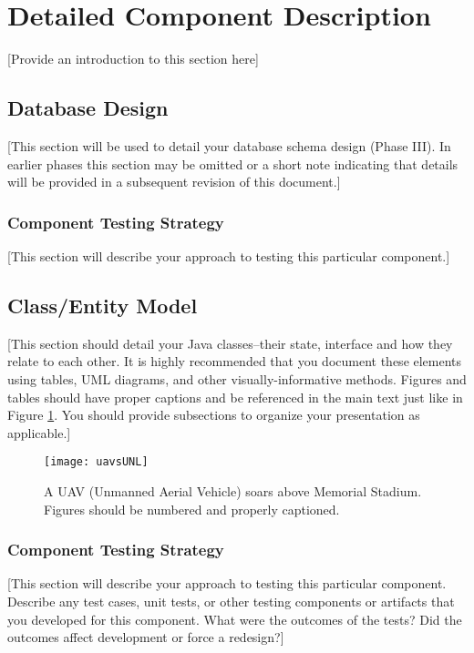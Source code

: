 \documentclass[12pt]{scrartcl} %
\begin{document}
\section{Detailed Component Description}

[Provide an introduction to this section here]

\subsection{Database Design}

[This section will be used to detail your database schema design (Phase III).  In earlier phases this section may be omitted or a short note indicating that details will be provided in a subsequent revision of this document.]

\subsubsection{Component Testing Strategy}

[This section will describe your approach to testing this particular component.]

\subsection{Class/Entity Model}

[This section should detail your Java classes--their state, interface and how they relate to each other.  It is highly recommended that you document these elements using tables, UML diagrams, and other visually-informative methods.  Figures and tables should have proper captions and be referenced in the main text just like in Figure \ref{figure:uav}.  You should provide subsections to organize your presentation as applicable.]

\begin{figure}
\centering
\texttt{[image: uavsUNL]}
\caption{A UAV (Unmanned Aerial Vehicle) soars above Memorial Stadium.  Figures should be numbered and properly captioned.}
\label{figure:uav}
\end{figure}

\subsubsection{Component Testing Strategy}

[This section will describe your approach to testing this particular component.  Describe any test cases, unit tests, or other testing components or artifacts that you developed for this component.  What were the outcomes of the tests?  Did the outcomes affect development or force a redesign?]
\end{document}
